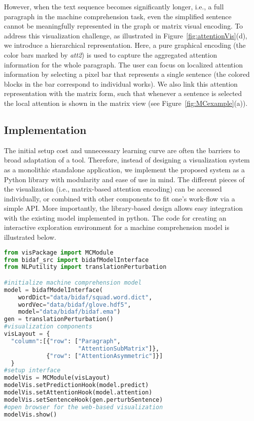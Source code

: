 However, when the text sequence becomes significantly longer, i.e., a full paragraph in the machine comprehension task,  even the simplified sentence cannot be meaningfully represented in the graph or matrix visual encoding. To address this visualization challenge, as illustrated in Figure~\ref{fig:attentionVis}(d), we introduce a hierarchical representation. Here, a pure graphical encoding (the color bars marked by \emph{att2}) is used to capture the aggregated attention information for the whole paragraph. The user can focus on localized attention information by selecting a pixel bar that represents a single sentence (the colored blocks in the bar correspond to individual works). We also link this attention representation with the matrix form, such that whenever a sentence is selected the local attention is shown in the matrix view (see Figure~\ref{fig:MCexample}(a)).

\subsection{Implementation}
The initial setup cost and unnecessary learning curve are often the barriers to broad adaptation of a tool. 
Therefore, instead of designing a visualization system as a monolithic standalone application, 
we implement the proposed system as a Python library with modularity and ease of use in mind.
The different pieces of the visualization (i.e., matrix-based attention encoding) can be accessed individually, 
or combined with other components to fit one's work-flow via a simple API.
More importantly, the library-based design allows easy integration with the existing model implemented in python.
The code for creating an interactive exploration environment for a machine comprehension model is illustrated below.

\begin{lstlisting}[language=Python, caption=Code for setting up the visualization system shown in Figure~\ref{fig:MCexample}(a).]
from visPackage import MCModule
from bidaf_src import bidafModelInterface
from NLPutility import translationPerturbation

#initialize machine comprehension model
model = bidafModelInterface(
    wordDict="data/bidaf/squad.word.dict",
    wordVec="data/bidaf/glove.hdf5",
    model="data/bidaf/bidaf.ema")
gen = translationPerturbation()
#visualization components
visLayout = {
  "column":[{"row": ["Paragraph", 
                     "AttentionSubMatrix"]},
            {"row": ["AttentionAsymmetric"]}]
  }
#setup interface
modelVis = MCModule(visLayout)
modelVis.setPredictionHook(model.predict)
modelVis.setAttentionHook(model.attention)
modelVis.setSentenceHook(gen.perturbSentence)
#open browser for the web-based visualization
modelVis.show()
\end{lstlisting}





